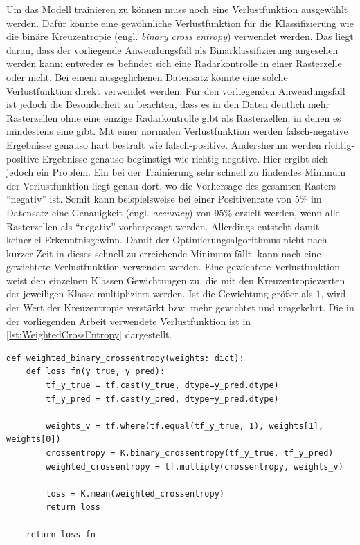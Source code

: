 Um das Modell trainieren zu können muss noch eine Verlustfunktion ausgewählt werden.
Dafür könnte eine gewöhnliche Verlustfunktion für die Klassifizierung wie die binäre Kreuzentropie (engl. \emph{binary cross entropy}) verwendet werden.
Das liegt daran, dass der vorliegende Anwendungsfall als Binärklassifizierung angesehen werden kann: entweder es befindet sich eine Radarkontrolle in einer Rasterzelle oder nicht.
Bei einem ausgeglichenen Datensatz könnte eine solche Verlustfunktion direkt verwendet werden.
Für den vorliegenden Anwendungsfall ist jedoch die Besonderheit zu beachten, dass es in den Daten deutlich mehr Rasterzellen ohne eine einzige Radarkontrolle gibt als Rasterzellen, in denen es mindestens eine gibt.
Mit einer normalen Verlustfunktion werden falsch-negative Ergebnisse genauso hart bestraft wie falsch-positive.
Andersherum werden richtig-positive Ergebnisse genauso begünstigt wie richtig-negative.
Hier ergibt sich jedoch ein Problem.
Ein bei der Trainierung sehr schnell zu findendes Minimum der Verlustfunktion liegt genau dort, wo die Vorhersage des gesamten Rasters "`negativ"' ist.
Somit kann beispielsweise bei einer Positivenrate von 5\% im Datensatz eine Genauigkeit (engl. \emph{accuracy}) von 95\% erzielt werden, wenn alle Rasterzellen als "`negativ"' vorhergesagt werden.
Allerdings entsteht damit keinerlei Erkenntnisgewinn.
Damit der Optimierungsalgorithmus nicht nach kurzer Zeit in dieses schnell zu erreichende Minimum fällt, kann nach \cite{CrimeConvLSTM} eine gewichtete Verlustfunktion verwendet werden.
Eine gewichtete Verlustfunktion weist den einzelnen Klassen Gewichtungen zu, die mit den Kreuzentropiewerten der jeweiligen Klasse multipliziert werden.
Ist die Gewichtung größer als $1$, wird der Wert der Kreuzentropie verstärkt bzw. mehr gewichtet und umgekehrt.
Die in der vorliegenden Arbeit verwendete Verlustfunktion ist in \autoref{lst:WeightedCrossEntropy} dargestellt.

\begin{code}
\begin{verbatim}
def weighted_binary_crossentropy(weights: dict):
    def loss_fn(y_true, y_pred):
        tf_y_true = tf.cast(y_true, dtype=y_pred.dtype)
        tf_y_pred = tf.cast(y_pred, dtype=y_pred.dtype)

        weights_v = tf.where(tf.equal(tf_y_true, 1), weights[1], weights[0])
        crossentropy = K.binary_crossentropy(tf_y_true, tf_y_pred)
        weighted_crossentropy = tf.multiply(crossentropy, weights_v)

        loss = K.mean(weighted_crossentropy)
        return loss

    return loss_fn
\end{verbatim}
\label{lst:WeightedCrossEntropy}
\end{code}

